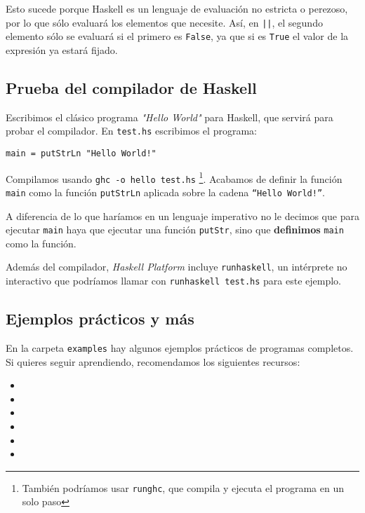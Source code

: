 Esto sucede porque Haskell es un lenguaje de evaluación no estricta o perezoso, por lo que sólo evaluará
los elementos que necesite. Así, en \texttt{||}, el segundo elemento sólo se evaluará si el
primero es \texttt{False}, ya que si es \texttt{True} el valor de la expresión ya estará fijado.


\subsection{Prueba del compilador de Haskell}

Escribimos el clásico programa \textit{"Hello World"} para Haskell,
que servirá para probar el compilador.
En \texttt{test.hs} escribimos el programa:

\begin{lstlisting}
main = putStrLn "Hello World!"
\end{lstlisting}

Compilamos usando \texttt{ghc -o hello test.hs}
\footnote{También podríamos usar \texttt{runghc}, que compila y ejecuta el programa
en un solo paso}.
Acabamos de definir la función \texttt{main} como la función \texttt{putStrLn}
aplicada sobre la cadena \texttt{``Hello World!''}.

A diferencia de lo que haríamos en un lenguaje imperativo no le decimos que
para ejecutar \texttt{main} haya que ejecutar una función \texttt{putStr},
sino que \textbf{definimos} \texttt{main} como la función.

Además del compilador, \textit{Haskell Platform} incluye \texttt{runhaskell}, un
intérprete no interactivo que podríamos llamar con \texttt{runhaskell test.hs}
para este ejemplo.

\subsection{Ejemplos prácticos y más}

En la carpeta \texttt{examples} hay algunos ejemplos prácticos de programas
completos. Si quieres seguir aprendiendo, recomendamos los siguientes recursos:

\begin{itemize}
  \item {}
  \item {}
  \item {}
  \item {}
  \item {}
  \item {}
\end{itemize}
